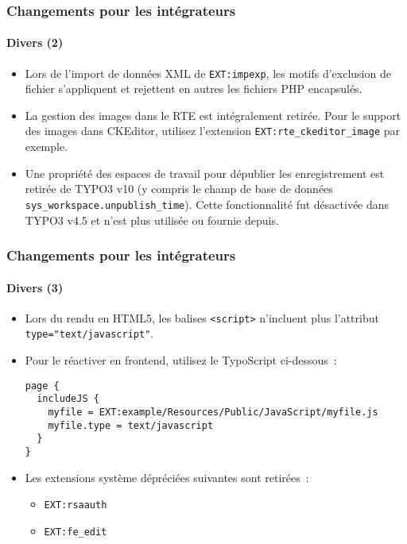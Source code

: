 \begin{frame}[fragile]
	\frametitle{Changements pour les intégrateurs}
	\framesubtitle{Divers (2)}

	\lstset{basicstyle=\tiny\ttfamily}

	\begin{itemize}

		\item Lors de l'import de données XML de \texttt{EXT:impexp}, les motifs d'exclusion de
			fichier s'appliquent et rejettent en autres les fichiers PHP encapsulés.

		\item La gestion des images dans le RTE est intégralement retirée.
			Pour le support des images dans CKEditor, utilisez l'extension \texttt{EXT:rte\_ckeditor\_image} par exemple.

		\item Une propriété des espaces de travail pour dépublier les enregistrement est retirée de TYPO3 v10
			(y compris le champ de base de données \texttt{sys\_workspace.unpublish\_time}).
			Cette fonctionnalité fut désactivée dans TYPO3 v4.5 et n'est plus utilisée ou fournie depuis.

	\end{itemize}

\end{frame}


\begin{frame}[fragile]
	\frametitle{Changements pour les intégrateurs}
	\framesubtitle{Divers (3)}

	\lstset{basicstyle=\tiny\ttfamily}

	\begin{itemize}

		\item Lors du rendu en HTML5, les balises \texttt{<script>} n'incluent plus l'attribut \texttt{type="text/javascript"}.
		\item Pour le réactiver en frontend, utilisez le TypoScript ci-dessous~:

\begin{lstlisting}
page {
  includeJS {
    myfile = EXT:example/Resources/Public/JavaScript/myfile.js
    myfile.type = text/javascript
  }
}
\end{lstlisting}

		\item Les extensions système dépréciées suivantes sont retirées~:
			\begin{itemize}
				\item \texttt{EXT:rsaauth}
				\item \texttt{EXT:fe\_edit}
			\end{itemize}

	\end{itemize}

\end{frame}

